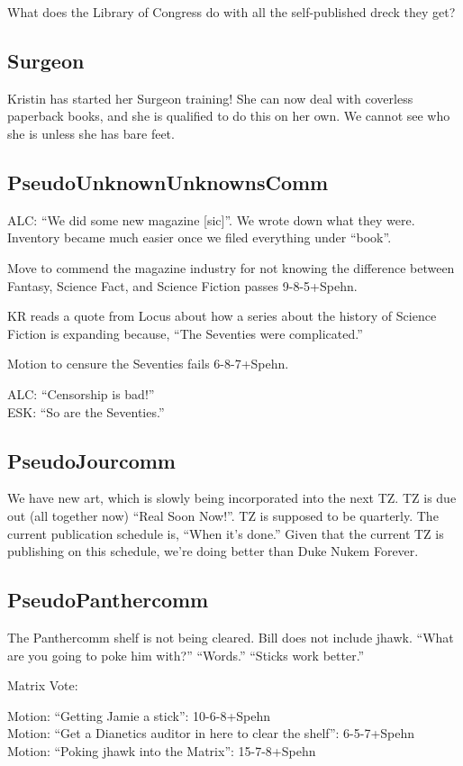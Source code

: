 \documentclass[10pt]{article}
\begin{document}
What does the Library of Congress do with all the self-published dreck they get?
\subsection*{Surgeon}
Kristin has started her Surgeon training! She can now deal with coverless paperback books, and she is qualified to do this on her own. We cannot see who she is unless she has bare feet.

\subsection*{PseudoUnknownUnknownsComm}
ALC: ``We did some new magazine [sic]''. We wrote down what they were. Inventory became much easier once we filed everything under ``book''.

Move to commend the magazine industry for not knowing the difference between Fantasy, Science Fact, and Science Fiction passes 9-8-5+Spehn. 

KR reads a quote from Locus about how a series about the history of Science Fiction is expanding because, ``The Seventies were complicated.''

Motion to censure the Seventies fails 6-8-7+Spehn.

ALC: ``Censorship is bad!''\\
ESK: ``So are the Seventies.''

\subsection*{PseudoJourcomm}

We have new art, which is slowly being incorporated into the next TZ. TZ is due out (all together now) ``Real Soon Now!''. TZ is supposed to be quarterly. The current publication schedule is, ``When it's done.'' Given that the current TZ is publishing on this schedule, we're doing better than Duke Nukem Forever.

\subsection*{PseudoPanthercomm}

The Panthercomm shelf is not being cleared. Bill does not include jhawk. ``What are you going to poke him with?'' ``Words.'' ``Sticks work better.''

Matrix Vote:

Motion: ``Getting Jamie a stick'': 10-6-8+Spehn\\
Motion: ``Get a Dianetics auditor in here to clear the shelf'': 6-5-7+Spehn\\
Motion: ``Poking jhawk into the Matrix'': 15-7-8+Spehn\\
\end{document}
